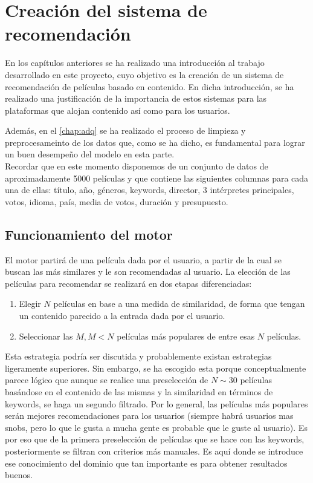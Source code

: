 \chapter{Creación del sistema de recomendación}\label{chap:creacion}


En los capítulos anteriores se ha realizado una introducción al trabajo desarrollado en este proyecto, cuyo objetivo es la creación de un sistema de recomendación de películas basado en contenido. En dicha introducción, se ha realizado una justificación de la importancia de estos sistemas para las plataformas que alojan contenido así como para los usuarios.

Además, en el \autoref{chap:adq} se ha realizado el proceso de limpieza y preprocesameinto de los datos que, como se ha dicho, es fundamental para lograr un buen desempeño del modelo en esta parte.\\

Recordar que en este momento disponemos de un conjunto de datos de aproximadamente 5000 películas y que contiene las siguientes columnas para cada una de ellas: título, año, géneros, keywords, director, 3 intérpretes principales, votos, idioma, país, media de votos, duración y presupuesto.

\section{Funcionamiento del motor}

El motor partirá de una película dada por el usuario, a partir de la cual se buscan las más similares y le son recomendadas al usuario. La elección de las películas para recomendar se realizará en dos etapas diferenciadas:
\begin{enumerate}
    \item Elegir $N$ películas en base a una medida de similaridad, de forma que tengan un contenido parecido a la entrada dada por el usuario.
    \item Seleccionar las $M, M<N$ películas más populares de entre esas $N$ películas.
\end{enumerate}

Esta estrategia podría ser discutida y probablemente existan estrategias ligeramente superiores. Sin embargo, se ha escogido esta porque conceptualmente parece lógico que aunque se realice una preselección de $N \sim 30$ películas basándose en el contenido de las mismas y la similaridad en términos de keywords, se haga un segundo filtrado. Por lo general, las películas más populares serán mejores recomendaciones para los usuarios (siempre habrá usuarios mas snobs, pero lo que le gusta a mucha gente es probable que le guste al usuario). Es por eso que de la primera preselección de películas que se hace con las keywords, posteriormente se filtran con criterios más manuales. Es aquí donde se introduce ese conocimiento del dominio que tan importante es para obtener resultados buenos.


